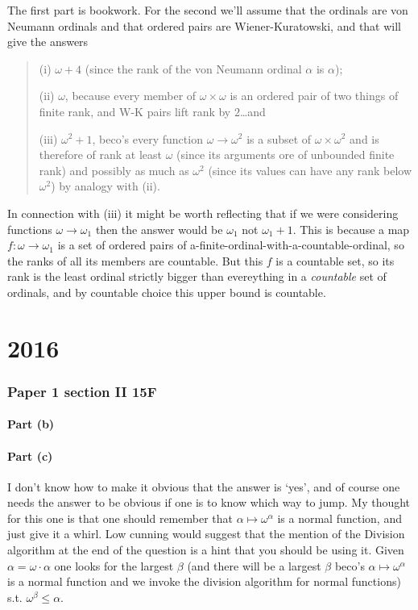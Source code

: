\documentclass{book}
\begin{document}
The first part is bookwork.  For the second we'll assume that the
ordinals are von Neumann ordinals and that ordered pairs are
Wiener-Kuratowski, and that will give the answers
\begin{quote}
(i) $\omega + 4$ (since the rank of the von Neumann ordinal $\alpha$ is $\alpha$); 

(ii) $\omega$, because every member of $\omega \times \omega$ is an ordered
pair of two things of finite rank, and W-K pairs lift rank by
$2$\ldots and 

(iii) $\omega^2 + 1$, beco's every function $\omega \to \omega^2$ is a
subset of $\omega \times \omega^2$ and is therefore of rank at least
$\omega$ (since its arguments ore of unbounded finite rank) and
possibly as much as $\omega^2$ (since its values can have any rank
below $\omega^2$) by analogy with (ii).\end{quote}

In connection with (iii) it might be worth reflecting that if we were
considering functions $\omega \to \omega_1$ then the answer would be
$\omega_1$ not $\omega_1 + 1$.  This is because a map $f:\omega \to
\omega_1$ is a set of ordered pairs of
a-finite-ordinal-with-a-countable-ordinal, so the ranks of all its
members are countable.  But this $f$ is a countable set, so its rank
is the least ordinal strictly bigger than evereything in a {\sl
  countable} set of ordinals, and by countable choice this upper bound
is countable.



\chapter{2016}


\subsection*{Paper 1 section II 15F}

\subsubsection*{Part (b)}

\subsubsection*{Part (c)}
I don't know how to make it obvious that the answer is `yes', and of
course one needs the answer to be obvious if one is to know which way
to jump.  My thought for this one is that one should remember that
$\alpha \mapsto \omega^\alpha$ is a normal function, and just give it
a whirl.  Low cunning would suggest that the mention of the Division
algorithm at the end of the question is a hint that you should be
using it.  Given $\alpha = \omega\cdot\alpha$ one looks for the
largest $\beta$ (and there will be a largest $\beta$ beco's
$\alpha \mapsto \omega^\alpha$ is a normal function and we invoke the
division algorithm for normal functions) s.t. $\omega^\beta \leq \alpha$.
\end{document}
